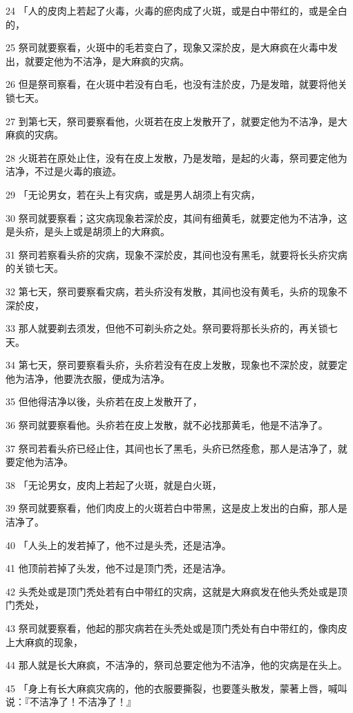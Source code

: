 \par 24 「人的皮肉上若起了火毒，火毒的瘀肉成了火斑，或是白中带红的，或是全白的，
\par 25 祭司就要察看，火斑中的毛若变白了，现象又深於皮，是大麻疯在火毒中发出，就要定他为不洁净，是大麻疯的灾病。
\par 26 但是祭司察看，在火斑中若没有白毛，也没有洼於皮，乃是发暗，就要将他关锁七天。
\par 27 到第七天，祭司要察看他，火斑若在皮上发散开了，就要定他为不洁净，是大麻疯的灾病。
\par 28 火斑若在原处止住，没有在皮上发散，乃是发暗，是起的火毒，祭司要定他为洁净，不过是火毒的痕迹。
\par 29 「无论男女，若在头上有灾病，或是男人胡须上有灾病，
\par 30 祭司就要察看；这灾病现象若深於皮，其间有细黄毛，就要定他为不洁净，这是头疥，是头上或是胡须上的大麻疯。
\par 31 祭司若察看头疥的灾病，现象不深於皮，其间也没有黑毛，就要将长头疥灾病的关锁七天。
\par 32 第七天，祭司要察看灾病，若头疥没有发散，其间也没有黄毛，头疥的现象不深於皮，
\par 33 那人就要剃去须发，但他不可剃头疥之处。祭司要将那长头疥的，再关锁七天。
\par 34 第七天，祭司要察看头疥，头疥若没有在皮上发散，现象也不深於皮，就要定他为洁净，他要洗衣服，便成为洁净。
\par 35 但他得洁净以後，头疥若在皮上发散开了，
\par 36 祭司就要察看他。头疥若在皮上发散，就不必找那黄毛，他是不洁净了。
\par 37 祭司若看头疥已经止住，其间也长了黑毛，头疥已然痊愈，那人是洁净了，就要定他为洁净。
\par 38 「无论男女，皮肉上若起了火斑，就是白火斑，
\par 39 祭司就要察看，他们肉皮上的火斑若白中带黑，这是皮上发出的白癣，那人是洁净了。
\par 40 「人头上的发若掉了，他不过是头秃，还是洁净。
\par 41 他顶前若掉了头发，他不过是顶门秃，还是洁净。
\par 42 头秃处或是顶门秃处若有白中带红的灾病，这就是大麻疯发在他头秃处或是顶门秃处，
\par 43 祭司就要察看，他起的那灾病若在头秃处或是顶门秃处有白中带红的，像肉皮上大麻疯的现象，
\par 44 那人就是长大麻疯，不洁净的，祭司总要定他为不洁净，他的灾病是在头上。
\par 45 「身上有长大麻疯灾病的，他的衣服要撕裂，也要蓬头散发，蒙著上唇，喊叫说：『不洁净了！不洁净了！』
